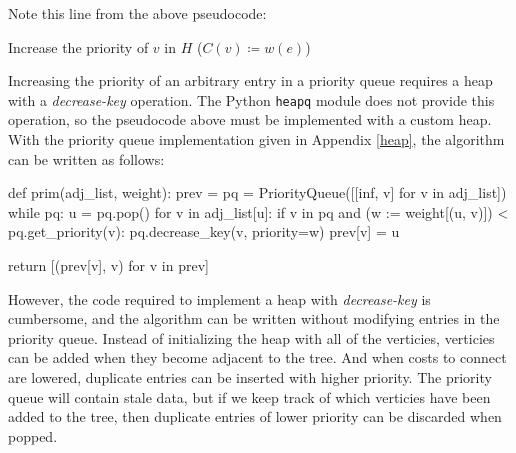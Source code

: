 \documentclass[12pt, titlepage]{article}
\begin{document}
Note this line from the above pseudocode:
\begin{center}
Increase the priority of $v$ in $H$\hspace{4mm} ($C(v)\coloneqq w(e)$)
\end{center}
Increasing the priority of an arbitrary entry in a priority queue requires a heap with a \textit{decrease-key} operation. The Python \texttt{heapq} module does not provide this operation, so the pseudocode above must be implemented with a custom heap. With the priority queue implementation given in Appendix \ref{heap}, the algorithm can be written as follows: \medskip

\begin{python}
def prim(adj_list, weight):
    prev = {}
    pq = PriorityQueue([[inf, v] for v in adj_list])
    while pq:
        u = pq.pop()
        for v in adj_list[u]:
            if v in pq and (w := weight[(u, v)]) < pq.get_priority(v):
                pq.decrease_key(v, priority=w)
                prev[v] = u

    return [(prev[v], v) for v in prev]
\end{python}

However, the code required to implement a heap with \textit{decrease-key} is cumbersome, and the algorithm can be written without modifying entries in the priority queue. Instead of initializing the heap with all of the verticies, verticies can be added when they become adjacent to the tree. And when costs to connect are lowered, duplicate entries can be inserted with higher priority. The priority queue will contain stale data, but if we keep track of which verticies have been added to the tree, then duplicate entries of lower priority can be discarded when popped. \\
\end{document}
